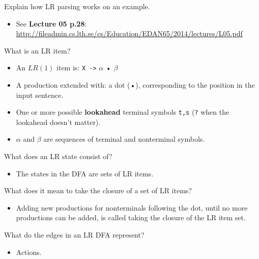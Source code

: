 \documentclass[11pt]{beamer}
\begin{document}
\begin{frame}


\begin{block}{Explain how LR parsing works on an example.}
\begin{itemize}
\item See \textbf{Lecture 05 p.28}: \url{http://fileadmin.cs.lth.se/cs/Education/EDAN65/2014/lectures/L05.pdf}
\end{itemize}
\end{block}


\begin{block}{What is an LR item?}
\begin{itemize}
\item An $LR(1)$ item is: \texttt{X ->} $\alpha$ • $\beta$ 
\item A production extended with: a dot (•), corresponding to the position in the input sentence. 
\item One or more possible \textbf{lookahead} terminal symbols \texttt{t,s} (\texttt{?} when the lookahead doesn't matter).
\item $\alpha$ and $\beta$ are sequences of terminal and nonterminal symbols.
\end{itemize}
\end{block}


\end{frame}

\begin{frame}

\begin{block}{What does an LR state consist of?}
\begin{itemize}
\item The states in the DFA are sets of LR items.
\end{itemize}
\end{block}

\begin{block}{What does it mean to take the closure of a set of LR items?}
\begin{itemize}
\item Adding new productions for nonterminals following the dot, until no more productions can be added, is called taking the closure of the LR item set.
\end{itemize}
\end{block}

\begin{block}{What do the edges in an LR DFA represent?}
\begin{itemize}
\item Actions.
\end{itemize}
\end{block}

\end{frame}
\end{document}
